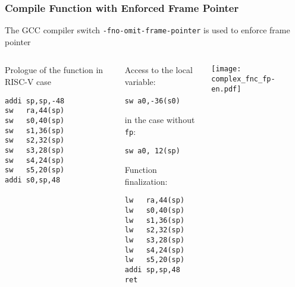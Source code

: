 \documentclass{beamer}
\begin{document}
\begin{frame}[fragile,shrink=5]
\frametitle{Compile Function with Enforced Frame Pointer}

The GCC compiler switch \texttt{-fno-omit-frame-pointer} is used to enforce frame pointer
\begin{columns}
\begin{column}{0.25\textwidth}
Prologue of the function in RISC-V case

\begin{verbatim}
addi sp,sp,-48
sw   ra,44(sp)
sw   s0,40(sp)
sw   s1,36(sp)
sw   s2,32(sp)
sw   s3,28(sp)
sw   s4,24(sp)
sw   s5,20(sp)
addi s0,sp,48
\end{verbatim}
\end{column}   
\begin{column}{0.4\textwidth}
Access to the local variable:

\begin{verbatim}
sw a0,-36(s0)
\end{verbatim}
in the case without \texttt{fp}:
\begin{verbatim}
sw a0, 12(sp)
\end{verbatim}



Function finalization:

\begin{verbatim}
lw   ra,44(sp)
lw   s0,40(sp)
lw   s1,36(sp)
lw   s2,32(sp)
lw   s3,28(sp)
lw   s4,24(sp)
lw   s5,20(sp)
addi sp,sp,48
ret
\end{verbatim}
\end{column}
\begin{column}{0.35\textwidth}  
\texttt{[image: complex\_fnc\_fp-en.pdf]}
\end{column}
\end{columns}
\end{frame}
\end{document}
